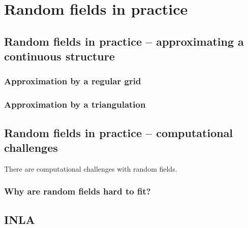 \chapter{Random fields in practice}

\section{Random fields in practice -- approximating a continuous structure}

\subsection{Approximation by a regular grid}
\subsection{Approximation by a triangulation}

\section{Random fields in practice -- computational challenges}
There are computational challenges with random fields.

\subsection{Why are random fields hard to fit?}

\section{INLA}




